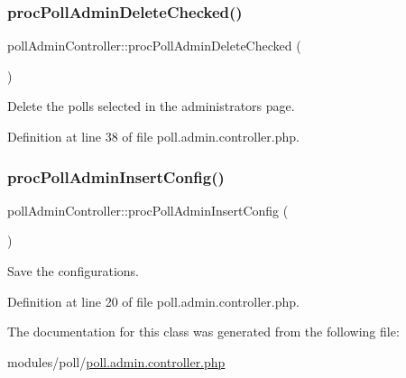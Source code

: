 \subsubsection{\texorpdfstring{proc\+Poll\+Admin\+Delete\+Checked()}{procPollAdminDeleteChecked()}}
{\footnotesize\ttfamily poll\+Admin\+Controller\+::proc\+Poll\+Admin\+Delete\+Checked (\begin{DoxyParamCaption}{ }\end{DoxyParamCaption})}



Delete the polls selected in the administrator\textquotesingle{}s page. 



Definition at line 38 of file poll.\+admin.\+controller.\+php.

\hypertarget{classpollAdminController_ab34f3cb8a5b40217ed0acdaaa11ee0ad}{}\label{classpollAdminController_ab34f3cb8a5b40217ed0acdaaa11ee0ad} 
\subsubsection{\texorpdfstring{proc\+Poll\+Admin\+Insert\+Config()}{procPollAdminInsertConfig()}}
{\footnotesize\ttfamily poll\+Admin\+Controller\+::proc\+Poll\+Admin\+Insert\+Config (\begin{DoxyParamCaption}{ }\end{DoxyParamCaption})}



Save the configurations. 



Definition at line 20 of file poll.\+admin.\+controller.\+php.



The documentation for this class was generated from the following file\+:\begin{DoxyCompactItemize}
\item 
modules/poll/\hyperlink{poll_8admin_8controller_8php}{poll.\+admin.\+controller.\+php}\end{DoxyCompactItemize}
